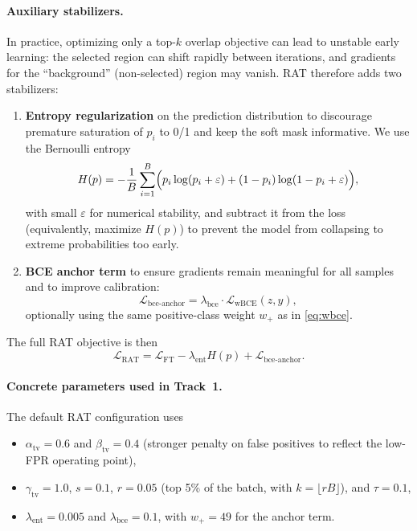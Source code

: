 \paragraph{Auxiliary stabilizers.}
In practice, optimizing only a top-$k$ overlap objective can lead to unstable early learning: the selected region can shift rapidly between iterations, and gradients for the ``background'' (non-selected) region may vanish.
RAT therefore adds two stabilizers:
\begin{enumerate}
  \item \textbf{Entropy regularization} on the prediction distribution to discourage premature saturation of $p_i$ to 0/1 and keep the soft mask informative.
        We use the Bernoulli entropy
        \begin{equation}
          H(p) = -\frac{1}{B}\sum_{i=1}^{B} \Bigl( p_i\log(p_i+\varepsilon) + (1-p_i)\log(1-p_i+\varepsilon)\Bigr),
          \label{eq:rat-entropy}
        \end{equation}
        with small $\varepsilon$ for numerical stability, and subtract it from the loss (equivalently, maximize $H(p)$) to prevent the model from collapsing to extreme probabilities too early.
  \item \textbf{BCE anchor term} to ensure gradients remain meaningful for all samples and to improve calibration:
        \begin{equation}
          \mathcal{L}_{\text{bce-anchor}} = \lambda_{\text{bce}} \cdot \mathcal{L}_{\text{wBCE}}(z,y),
          \label{eq:rat-bce-anchor}
        \end{equation}
        optionally using the same positive-class weight $w_{+}$ as in \eqref{eq:wbce}.
\end{enumerate}
The full RAT objective is then
\begin{equation}
  \mathcal{L}_{\text{RAT}} = \mathcal{L}_{\text{FT}} - \lambda_{\text{ent}} H(p) + \mathcal{L}_{\text{bce-anchor}}.
  \label{eq:rat}
\end{equation}

\paragraph{Concrete parameters used in Track~1.}
The default RAT configuration uses
\begin{itemize}
  \item $\alpha_{\mathrm{tv}}=0.6$ and $\beta_{\mathrm{tv}}=0.4$ (stronger penalty on false positives to reflect the low-FPR operating point),
  \item $\gamma_{\mathrm{tv}}=1.0$, $s=0.1$, $r=0.05$ (top 5\% of the batch, with $k=\lfloor rB \rfloor$), and $\tau=0.1$,
  \item $\lambda_{\text{ent}}=0.005$ and $\lambda_{\text{bce}}=0.1$, with $w_{+}=49$ for the anchor term.
\end{itemize}

